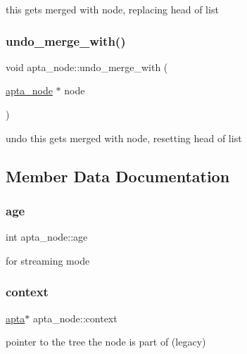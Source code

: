 this gets merged with node, replacing head of list \mbox{\label{classapta__node_aaaa403466a13fa9a8884c36a242ff49d}} 
\subsubsection{\texorpdfstring{undo\+\_\+merge\+\_\+with()}{undo\_merge\_with()}}
{\footnotesize\ttfamily void apta\+\_\+node\+::undo\+\_\+merge\+\_\+with (\begin{DoxyParamCaption}\item[{\hyperlink{classapta__node}{apta\+\_\+node} $\ast$}]{node }\end{DoxyParamCaption})\hspace{0.3cm}{\ttfamily [inline]}}

undo this gets merged with node, resetting head of list 

\subsection{Member Data Documentation}
\mbox{\label{classapta__node_a24d4af165b37f04090c85df1ef3ac997}} 
\subsubsection{\texorpdfstring{age}{age}}
{\footnotesize\ttfamily int apta\+\_\+node\+::age}

for streaming mode \mbox{\label{classapta__node_ae216b528459a269d45957a919a6180e8}} 
\subsubsection{\texorpdfstring{context}{context}}
{\footnotesize\ttfamily \hyperlink{classapta}{apta}$\ast$ apta\+\_\+node\+::context}

pointer to the tree the node is part of (legacy) \mbox{\label{classapta__node_a9b2762e845a7776004e7edab7dae8718}} 

